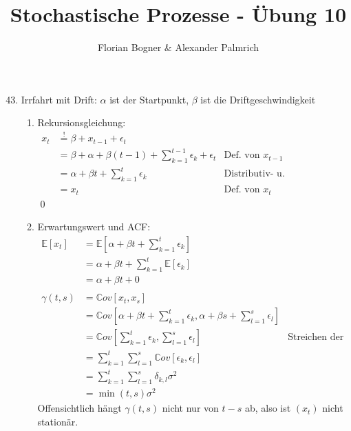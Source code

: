 \documentclass[a4paper,11pt,notitlepage,fullpage]{article}
\newcommand{\E}[1]{\mathbb E\left[#1\right]}
\newcommand{\Cov}[1]{\mathbb Cov\left[#1\right]}
\begin{document}
\author{Florian Bogner \& Alexander Palmrich}
\title{Stochastische Prozesse - Übung 10}
\maketitle

\begin{enumerate}
\setcounter{enumi}{42}


\item Irrfahrt mit Drift: $\alpha$ ist der Startpunkt, $\beta$ ist die Driftgeschwindigkeit
\begin{enumerate}
\item Rekursionsgleichung:
\begin{align*}
x_t &\stackrel{!}{=} \beta + x_{t-1} + \epsilon_t \\
&= \beta + \alpha + \beta(t-1) + \sum_{k=1}^{t-1} \epsilon_k + \epsilon_t &\text{Def. von } x_{t-1} \\
&= \alpha + \beta t + \sum_{k=1}^t \epsilon_k &\text{Distributiv- u. Assozativgesetz} \\
&= x_t  &\text{Def. von } x_t
\end{align*} \qed
\item Erwartungswert und ACF:
\begin{align*}
\E{x_t} &= \E{\alpha + \beta t + \sum_{k=1}^t \epsilon_k} \\
&= \alpha + \beta t + \sum_{k=1}^t \E{\epsilon_k} \\
&= \alpha + \beta t + 0 \\ \\
\gamma(t, s) &= \Cov{x_t, x_s} \\
&= \Cov{\alpha + \beta t + \sum_{k=1}^t \epsilon_k, \alpha + \beta s + \sum_{l=1}^s \epsilon_l} \\
&= \Cov{\sum_{k=1}^t \epsilon_k, \sum_{l=1}^s \epsilon_l} &\text{Streichen der determ. Terme}\\
&= \sum_{k=1}^t \sum_{l=1}^s \Cov{\epsilon_k, \epsilon_l} \\
&= \sum_{k=1}^t \sum_{l=1}^s \delta_{k,l} \sigma^2 \\
&= \min(t,s) \sigma^2
\end{align*}
Offensichtlich hängt $\gamma(t,s)$ nicht nur von $t-s$ ab, also ist $(x_t)$ nicht stationär.

\end{enumerate}
\end{enumerate}
\end{document}
